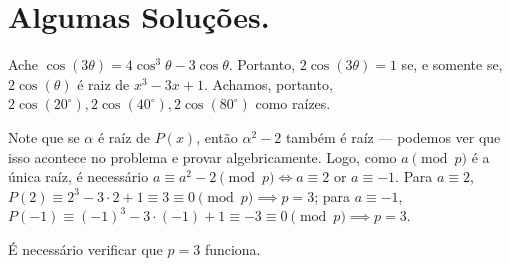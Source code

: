 
	\newpage
	\section*{Algumas Soluções.}
	\begin{sk}
		Ache $\cos(3\theta) = 4\cos^3\theta - 3\cos\theta$. Portanto, $2\cos(3\theta) = 1$ se, e somente se, $2\cos(\theta)$ é raiz de $x^3 - 3x + 1$. Achamos, portanto, $2\cos(20^\circ), 2\cos(40^\circ), 2\cos(80^\circ)$ como raízes.
	\end{sk}

	\begin{sk}
		Note que se $\alpha$ é raíz de $P(x)$, então $\alpha^2 - 2$ também é raíz --- podemos ver que isso acontece no problema  e provar algebricamente. Logo, como $a \pmod{p}$ é a única raíz, é necessário $a \equiv a^2 - 2 \pmod{p} \iff a \equiv 2$ or $a \equiv -1$. Para $a \equiv 2$, $P(2) \equiv 2^3 - 3\cdot2 + 1 \equiv 3 \equiv 0 \pmod{p} \implies p = 3$; para $a \equiv -1$,  $P(-1) \equiv (-1)^3 - 3\cdot(-1) + 1 \equiv -3 \equiv 0 \pmod{p} \implies p = 3$.

		É necessário verificar que $p = 3$ funciona.
	\end{sk}

